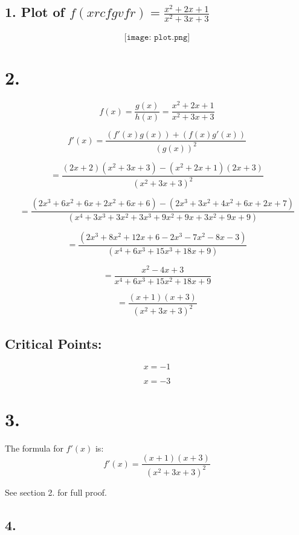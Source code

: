 \begin{solutionbox}{}\newline
\section*{1. Plot of $f(xrcfgvfr) = \frac{x^2 + 2x + 1}{x^2 + 3x +3}$}
\[
    \texttt{[image: plot.png]}
\]

\end{solutionbox}
\newpage
\begin{solutionbox}{}\newline

\section*{2.}
\[
    f(x) = \frac{g(x)}{h(x)}= \frac{x^2 + 2x + 1}{x^2 + 3x + 3}
\]

\[
    f'(x) = \frac{(f'(x)g(x))+(f(x)g'(x))}{(g(x))^2}
\]

\[
    = \frac{(2x+2)(x^2 + 3x + 3) - (x^2 + 2x + 1)(2x+3)}{(x^2 + 3x + 3)^2}
\]

\[
    = \frac{(2x^3 + 6x^2 + 6x + 2x^2 + 6x + 6)-(2x^3 + 3x^2 + 4x^2 + 6x + 2x + 7)}{(x^4+3x^3 + 3x^2 + 3x^3 + 9x^2 + 9x + 3x^2 + 9x + 9)}
\]

\[
    = \frac{(2x^3 + 8x^2 + 12x + 6 - 2x^3 - 7x^2 - 8x - 3)}{(x^4 + 6x^3 + 15x^3 + 18x + 9)}
\]

\[
    = \frac{x^2 - 4x + 3}{x^4 + 6x^3 + 15x^2 + 18x + 9}
\]

\[
    = \frac{(x+1)(x+3)}{(x^2 + 3x + 3)^2}
\]

\subsection*{Critical Points:}

\[x = -1\]

\[x = -3\]

\section*{3.}
The formula for $f'(x)$ is:
\[
 f'(x)= \frac{(x+1)(x+3)}{(x^2 + 3x + 3)^2}
\]

See section 2. for full proof.
\end{solutionbox}
\newpage
\begin{solutionbox}{}\newline


\section*{4.}


\end{solutionbox}
